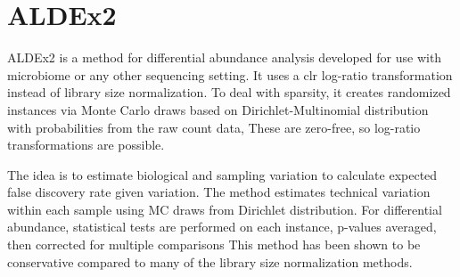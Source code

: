 \documentclass[
]{book}
\begin{document}
\hypertarget{aldex2}{%
\section{ALDEx2}\label{aldex2}}

ALDEx2 \citep{fernandes2014} is a method for differential abundance analysis developed for use with microbiome or any other sequencing setting. It uses a clr log-ratio transformation instead of library size normalization. To deal with sparsity, it creates randomized instances via Monte Carlo draws based on Dirichlet-Multinomial distribution with probabilities from the raw count data, These are zero-free, so log-ratio transformations are possible.

The idea is to estimate biological and sampling variation to calculate expected false discovery rate given variation. The method estimates technical variation within each sample using MC draws from Dirichlet distribution. For differential abundance, statistical tests are performed on each instance, p-values averaged, then corrected for multiple comparisons This method has been shown to be conservative compared to many of the library size normalization methods.
\end{document}

